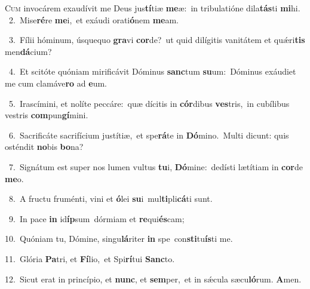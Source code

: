 \lettrine{\initial\textcolor{\initialcolor}{C}}{um} invocárem exaudívit me Deus jus\-\textbf{tí}\-tiæ \textbf{me}\-æ:~\star in tribulatióne dila\-\textbf{tás}\-ti \textbf{mi}\-hi.\\
{\numbfont\textcolor{\numbcolor}{~2.}}~Mise\-\textbf{ré}\-re \textbf{me}\-i,~\star et exáudi orati\-\textbf{ó}\-nem \textbf{me}\-am.\par
{\numbfont\textcolor{\numbcolor}{~3.}}~Fílii hóminum, úsquequo \textbf{gra}\-vi \textbf{cor}\-de?~\star ut quid dilígitis vanitátem et quǽri\textbf{tis} men\-\textbf{dá}\-cium?\par
{\numbfont\textcolor{\numbcolor}{~4.}}~Et scitóte quóniam mirificávit Dóminus \textbf{sanc}\-tum \textbf{su}\-um:~\star Dóminus exáudiet me cum clamáve\textbf{ro} ad \textbf{e}\-um.\par
{\numbfont\textcolor{\numbcolor}{~5.}}~Irascímini, et nolíte peccáre:~\dagger quæ dícitis in \textbf{cór}\-dibus \textbf{ves}\-tris,~\star in cubílibus vestris \textbf{com}\-pun\-\textbf{gí}\-mini.\par
{\numbfont\textcolor{\numbcolor}{~6.}}~Sacrificáte sacrifícium justítiæ,~\dagger et spe\-\textbf{rá}\-te in \textbf{Dó}\-mino.~\star Multi dicunt: quis osténdit \textbf{no}\-bis \textbf{bo}\-na?\par
{\numbfont\textcolor{\numbcolor}{~7.}}~Signátum est super nos lumen vultus \textbf{tu}\-i, \textbf{Dó}\-mine:~\star dedísti lætítiam in \textbf{cor}\-de \textbf{me}\-o.\par
{\numbfont\textcolor{\numbcolor}{~8.}}~A fructu fruménti, vini et \textbf{ó}\-lei \textbf{su}\-i~\star mul\-\textbf{ti}\-pli\-\textbf{cá}\-ti sunt.\par
{\numbfont\textcolor{\numbcolor}{~9.}}~In pace \textbf{in} id\-\textbf{íp}\-sum~\star dórmiam et \textbf{re}\-qui\-\textbf{és}\-cam;\par
{\numbfont\textcolor{\numbcolor}{10.}}~Quóniam tu, Dómine, singu\-\textbf{lá}\-riter \textbf{in} spe~\star con\-\textbf{sti}\-tu\-\textbf{ís}\-ti me.\par
{\numbfont\textcolor{\numbcolor}{11.}}~Glória \textbf{Pa}\-tri, et \textbf{Fí}\-lio,~\star et Spi\-\textbf{rí}\-tui \textbf{Sanc}\-to.\par
{\numbfont\textcolor{\numbcolor}{12.}}~Sicut erat in princípio, et \textbf{nunc}\-, et \textbf{sem}\-per,~\star et in sǽcula sæcu\-\textbf{ló}\-rum. \textbf{A}\-men.\par
